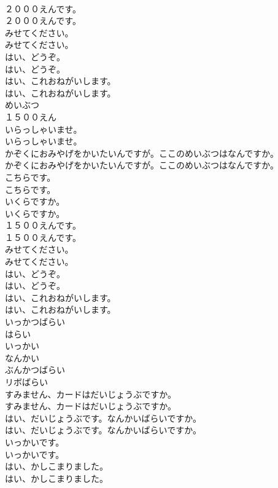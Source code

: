 \documentclass[8pt]{extreport}
\begin{document}
\begin{CJK}{UTF8}{min}
\\	２０００えんです。	
\\	２０００えんです。 
\\	みせてください。	
\\	みせてください。 
\\	はい、どうぞ。	
\\	はい、どうぞ。 
\\	はい、これおねがいします。	
\\	はい、これおねがいします。 
\\	めいぶつ
\\	１５００えん
\\	いらっしゃいませ。	
\\	いらっしゃいませ。 
\\	かぞくにおみやげをかいたいんですが。ここのめいぶつはなんですか。	
\\	かぞくにおみやげをかいたいんですが。ここのめいぶつはなんですか。 
\\	こちらです。	
\\	こちらです。 
\\	いくらですか。	
\\	いくらですか。 
\\	１５００えんです。	
\\	１５００えんです。 
\\	みせてください。	
\\	みせてください。 
\\	はい、どうぞ。	
\\	はい、どうぞ。 
\\	はい、これおねがいします。	
\\	はい、これおねがいします。 
\\	いっかつばらい
\\	はらい
\\	いっかい
\\	なんかい
\\	ぶんかつばらい
\\	リボばらい
\\	すみません、カードはだいじょうぶですか。	
\\	すみません、カードはだいじょうぶですか。 
\\	はい、だいじょうぶです。なんかいばらいですか。	
\\	はい、だいじょうぶです。なんかいばらいですか。 
\\	いっかいです。	
\\	いっかいです。 
\\	はい、かしこまりました。	
\\	はい、かしこまりました。 

\end{CJK}
\end{document}
